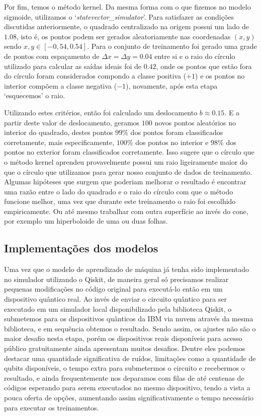 Por fim, temos o método kernel. Da mesma forma com o que fizemos no modelo sigmoide, utilizamos o `\textit{statevector\_simulator}'. Para satisfazer as condições discutidas anteriormente, o quadrado centralizado na origem possui um lado de $1.08$, isto é, os pontos podem ser gerados aleatoriamente nas coordenadas $\left(x,y\right)$ sendo $x,y\in\left[-0,54,0.54\right]$. Para o conjunto de treinamento foi gerado uma grade de pontos com espaçamento de $\Delta x=\Delta y=0.04$ entre si e o raio do círculo utilizado para calcular as saídas ideais foi de $0.42$, onde os pontos que estão fora do círculo foram considerados compondo a classe positiva ($+1$) e os pontos no interior compõem a classe negativa ($-1$), novamente, após esta etapa `esquecemos' o raio.

Utilizando estes critérios, então foi calculado um deslocamento $b\approx 0.15$. E a partir deste valor de deslocamento, geramos $100$ novos pontos aleatórios no interior do quadrado, destes pontos $99\%$ dos pontos foram classificados corretamente, mais especificamente, $100\%$ dos pontos no interior e $98\%$ dos pontos no exterior foram classificados corretamente. Isso sugere que o círculo que o método kernel aprendeu provavelmente possui um raio ligeiramente maior do que o círculo que utilizamos para gerar nosso conjunto de dados de treinamento. Algumas hipóteses que surgem que poderiam melhorar o resultado é encontrar uma razão entre o lado do quadrado e o raio do círculo com que o método funcione melhor, uma vez que durante este treinamento o raio foi escolhido empiricamente. Ou até mesmo trabalhar com outra superfície ao invés do cone, por exemplo um hiperboloide de uma ou duas folhas.
 
\subsection{Implementações dos modelos}

Uma vez que o modelo de aprendizado de máquina já tenha sido implementado no simulador utilizando o Qiskit, de maneira geral só precisamos realizar pequenas modificações no código original para executá-lo então em um dispositivo quântico real. Ao invés de enviar o circuito quântico para ser executado em um simulador local disponibilizado pela biblioteca Qiskit, o  submetemos para os dispositivos quânticos da IBM via nuvem através da mesma biblioteca, e em sequência obtemos o resultado. Sendo assim, os ajustes não são o maior desafio nesta etapa, porém os dispositivos reais disponíveis para acesso público gratuitamente ainda apresentam muitos desafios. Dentre eles podemos destacar uma quantidade significativa de ruídos,  limitações como a quantidade de qubits disponíveis, o tempo extra para submetermos o circuito e recebermos o resultado, e ainda frequentemente nos deparamos com filas de até centenas de códigos esperando para serem executados no mesmo dispositivo, tendo a vista a pouca oferta de opções, aumentando assim significativamente o tempo necessário para executar os treinamentos. 

